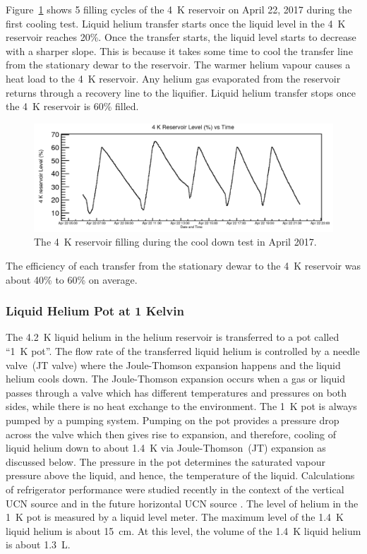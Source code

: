 Figure~\ref{fig:4kfilling} shows 5 filling cycles of the 4~K reservoir
on April 22, 2017 during the first cooling test. Liquid helium
transfer starts once the liquid level in the 4~K reservoir reaches
20\%. Once the transfer starts, the liquid level starts to decrease
with a sharper slope. This is because it takes some time to cool the
transfer line from the stationary dewar to the reservoir. The warmer
helium vapour causes a heat load to the 4~K reservoir. Any helium gas
evaporated from the reservoir returns through a recovery line to the
liquifier. Liquid helium transfer stops once the 4~K reservoir is 60\%
filled.

\begin{figure}[h!]
  \centering
  \includegraphics[width=1.0\textwidth]{april_4kfilling.png}
  \caption{The 4~K reservoir filling during the cool down test in
    April 2017.}
  \label{fig:4kfilling}
\end{figure}
The efficiency of each transfer from the stationary dewar to the 4~K
reservoir was about 40\% to 60\% on average.

\subsubsection{Liquid Helium Pot at 1 Kelvin}
The 4.2~K liquid helium in the helium reservoir is transferred to a pot
called ``1~K pot''. The flow rate of the transferred liquid helium is
controlled by a needle valve~(JT valve) where the Joule-Thomson
expansion happens and the liquid helium cools down. The Joule-Thomson
expansion occurs when a gas or liquid passes through a valve which has
different temperatures and pressures on both sides, while there is no
heat exchange to the environment.  The 1~K pot is always pumped by a
pumping system. Pumping on the pot provides a pressure drop across the
valve which then gives rise to expansion, and therefore, cooling of
liquid helium down to about 1.4~K via Joule-Thomson~(JT) expansion as
discussed below. The pressure in the pot determines the saturated
vapour pressure above the liquid, and hence, the temperature of the
liquid.  Calculations of refrigerator performance were studied
recently in the context of the vertical UCN source
\cite{Florian_thesis} and in the future horizontal UCN source
\cite{sweitz}. The level of helium in the 1~K pot is measured by a
liquid level meter. The maximum level of the 1.4~K liquid helium is
about 15~cm. At this level, the volume of the 1.4~K liquid helium is
about 1.3~L.

